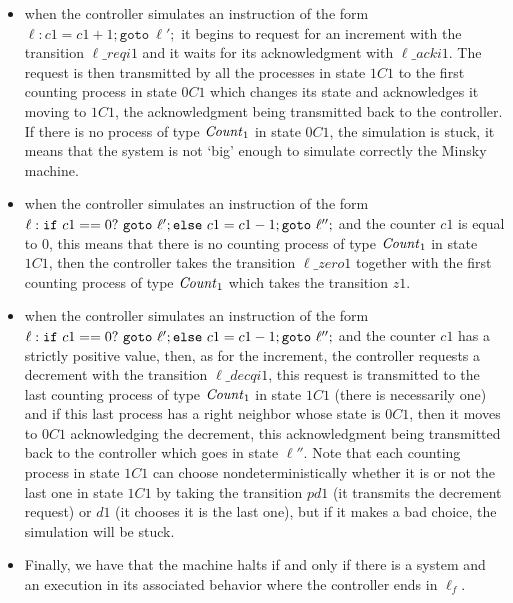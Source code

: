 \begin{itemize}
    \item when the controller simulates an instruction of the form $\ell:c1=c1+1;\mathtt{goto}~\ell';$
        it begins to request for an increment with the transition $\ell\_reqi1$ and it waits for its acknowledgment with $\ell\_acki1$.
        The request is then transmitted by all the processes in state $1C1$
        to the first counting process in state $0C1$ which changes its state and acknowledges it moving to $1C1$,
        the acknowledgment being transmitted back to the controller.
        If there is no process of type $\mathit{Count}_1$ in state $0C1$, the simulation is stuck,
        it means that the system is not `big' enough to simulate correctly the Minsky machine.
    \item when the controller simulates an instruction of the form
        $\ell:\mathtt{if}~c1==0?~\mathtt{goto}~ \ell';\linebreak[0] \mathtt{else}~c1=c1-1;\mathtt{goto}~\ell'';$
        and the counter $c1$ is equal to $0$,
        this means that there is no counting process of type $\mathit{Count}_1$ in state $1C1$,
        then the controller takes the transition $\ell\_zero1$ together with the first counting process of type
        $\mathit{Count}_1$ which takes the transition $z1$.
    \item when the controller simulates an instruction of the form
        $\ell:\mathtt{if}~c1==0?~\mathtt{goto}~ \ell';\linebreak[0] \mathtt{else}~c1=c1-1;\mathtt{goto}~\ell'';$
        and the counter $c1$ has a strictly positive value, then, as for the increment,
        the controller requests a decrement with the transition $\ell\_decqi1$,
        this request is transmitted to the last counting process of type $\mathit{Count}_1$ in state $1C1$
        (there is necessarily one) and if this last process has a right neighbor whose state is $0C1$,
        then it moves to $0C1$ acknowledging the decrement,
        this acknowledgment being transmitted back to the controller which goes in state $\ell''$.
        Note that each counting process in state $1C1$ can choose nondeterministically
        whether it is or not the last one in state $1C1$ by taking the transition $pd1$
        (it transmits the decrement request) or $d1$ (it chooses it is the last one),
        but if it makes a bad choice, the simulation will be stuck.
    \item Finally, we have that the machine halts if and only if there is a system and an execution
        in its associated behavior where the controller ends in $\ell_f$.
\end{itemize}


